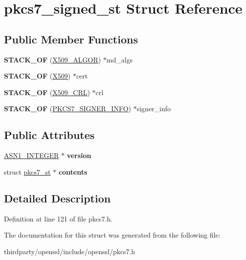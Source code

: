 \hypertarget{structpkcs7__signed__st}{}\section{pkcs7\+\_\+signed\+\_\+st Struct Reference}
\label{structpkcs7__signed__st}
\subsection*{Public Member Functions}
\begin{DoxyCompactItemize}
\item 
\mbox{\label{structpkcs7__signed__st_a050bcf61058179b5d869b55e7e357816}} 
{\bfseries S\+T\+A\+C\+K\+\_\+\+OF} (\hyperlink{struct_x509__algor__st}{X509\+\_\+\+A\+L\+G\+OR}) $\ast$md\+\_\+algs
\item 
\mbox{\label{structpkcs7__signed__st_a65d24e39f334b42fa460d9d7a87398ef}} 
{\bfseries S\+T\+A\+C\+K\+\_\+\+OF} (\hyperlink{structx509__st}{X509}) $\ast$cert
\item 
\mbox{\label{structpkcs7__signed__st_ac57f323e546efcca576407ecebd2177a}} 
{\bfseries S\+T\+A\+C\+K\+\_\+\+OF} (\hyperlink{struct_x509__crl__st}{X509\+\_\+\+C\+RL}) $\ast$crl
\item 
\mbox{\label{structpkcs7__signed__st_a4580e59fda0e62101ecc513a43512cee}} 
{\bfseries S\+T\+A\+C\+K\+\_\+\+OF} (\hyperlink{structpkcs7__signer__info__st}{P\+K\+C\+S7\+\_\+\+S\+I\+G\+N\+E\+R\+\_\+\+I\+N\+FO}) $\ast$signer\+\_\+info
\end{DoxyCompactItemize}
\subsection*{Public Attributes}
\begin{DoxyCompactItemize}
\item 
\mbox{\label{structpkcs7__signed__st_afca26f9f6d8c5c95f805c3c236f04904}} 
\hyperlink{structasn1__string__st}{A\+S\+N1\+\_\+\+I\+N\+T\+E\+G\+ER} $\ast$ {\bfseries version}
\item 
\mbox{\label{structpkcs7__signed__st_a41182027c38487c5be24e8609f4590f8}} 
struct \hyperlink{structpkcs7__st}{pkcs7\+\_\+st} $\ast$ {\bfseries contents}
\end{DoxyCompactItemize}


\subsection{Detailed Description}


Definition at line 121 of file pkcs7.\+h.



The documentation for this struct was generated from the following file\+:\begin{DoxyCompactItemize}
\item 
thirdparty/openssl/include/openssl/pkcs7.\+h\end{DoxyCompactItemize}

